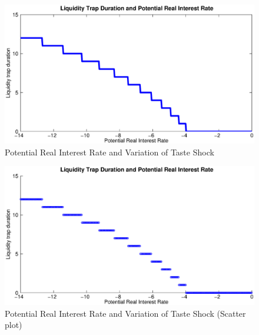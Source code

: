\documentclass[12pt,a4paper,oneside,titlepage]{article}
\begin{document}
\begin{figure}[p]
\includegraphics[width=\textwidth]{Paperpics/Figure1b}
\caption{Potential Real Interest Rate and Variation of Taste Shock}
\label{Figure1b}
\end{figure}

\begin{figure}[p]
\includegraphics[width=\textwidth]{Paperpics/Figure1bscatter}
\caption{Potential Real Interest Rate and Variation of Taste Shock (Scatter plot)}
\label{Figure1bscatter}
\end{figure}
\end{document}
